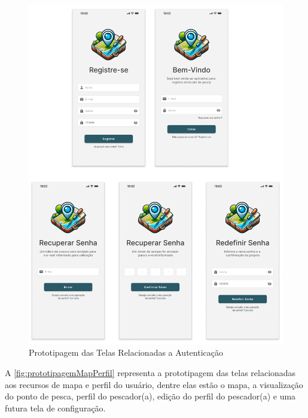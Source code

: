\begin{figure}[H]
    \centering
    \caption{Prototipagem das Telas Relacionadas a Autenticação}
    \label{fig:prototipagemAutenticacaoUsuario}
    \includegraphics[scale=0.24]{./dados/figuras/prototipagem-autenticacao-de-usuario.png}
\end{figure}

A \autoref{fig:prototipagemMapPerfil} representa a prototipagem das telas relacionadas aos recursos de mapa e perfil do usuário, dentre elas estão o mapa, a visualização do ponto de pesca, perfil do pescador(a), edição do perfil do pescador(a) e uma futura tela de configuração.

